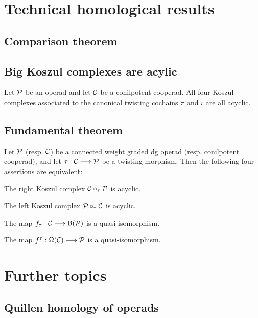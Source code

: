 
\section{Technical homological results}

\subsection{Comparison theorem}

\subsection{Big Koszul complexes are acylic}

\begin{theorem}\label{thm:augacyclic}
Let ${\mathcal{P}}$ be an operad and let $\mathcal{C}$ be a conilpotent cooperad. All four
Koszul complexes associated to the canonical twisting cochains
$\pi$ and $\iota$ are all acyclic. 
\end{theorem}
\subsection{Fundamental theorem}

\begin{theorem}\label{thm:fundamental}
Let ${\mathcal{P}}$ (resp. $\mathcal{C}$) be a connected weight graded dg operad
(resp. conilpotent cooperad), and let $\tau : \mathcal{C}\longrightarrow
{\mathcal{P}}$ be a twisting morphism. Then the following four assertions are
equivalent:
\begin{tenumerate}
\item The right Koszul complex $\mathcal{C}\circ_\tau {\mathcal{P}}$ is acyclic.
\item The left Koszul complex ${\mathcal{P}}\circ_\tau \mathcal{C}$ is acyclic.
\item The map $f_\tau : \mathcal{C}\longrightarrow \mathsf{B}({\mathcal{P}})$ is a quasi-isomorphism.
\item The map $f^\tau : \Omega(\mathcal{C})\longrightarrow {\mathcal{P}}$ is a quasi-isomorphism.
\end{tenumerate}
\end{theorem}
\section{Further topics}

\subsection{Quillen homology of operads}

